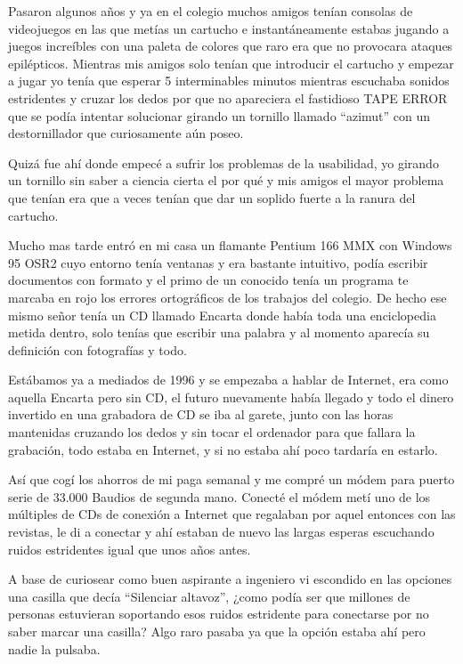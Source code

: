 \bigskip
Pasaron algunos años y ya en el colegio muchos amigos tenían consolas de videojuegos en las que metías un cartucho e instantáneamente estabas jugando a juegos increíbles con una paleta de colores que raro era que no provocara ataques epilépticos. Mientras mis amigos solo tenían que introducir el cartucho y empezar a jugar yo tenía que esperar 5 interminables minutos mientras escuchaba sonidos estridentes y cruzar los dedos por que no apareciera el fastidioso TAPE ERROR que se podía intentar solucionar girando un tornillo llamado ``azimut'' con un destornillador que curiosamente aún poseo.

\bigskip
Quizá fue ahí donde empecé a sufrir los problemas de la usabilidad, yo girando un tornillo sin saber a ciencia cierta el por qué y mis amigos el mayor problema que tenían era que a veces tenían que dar un soplido fuerte a la ranura del cartucho.

\bigskip
Mucho mas tarde entró en mi casa un flamante Pentium 166 MMX con Windows 95 OSR2 cuyo entorno tenía ventanas y era bastante intuitivo, podía escribir documentos con formato y el primo de un conocido tenía un programa te marcaba en rojo los errores ortográficos de los trabajos del colegio. De hecho ese mismo señor tenía un CD llamado Encarta donde había toda una enciclopedia metida dentro, solo tenías que escribir una palabra y al momento aparecía su definición con fotografías y todo.

\bigskip
Estábamos ya a mediados de 1996 y se empezaba a hablar de Internet, era como aquella Encarta pero sin CD, el futuro nuevamente había llegado y todo el dinero invertido en una grabadora de CD se iba al garete, junto con las horas mantenidas cruzando los dedos y sin tocar el ordenador para que fallara la grabación, todo estaba en Internet, y si no estaba ahí poco tardaría en estarlo.

\bigskip
Así que cogí los ahorros de mi paga semanal y me compré un módem para puerto serie de 33.000 Baudios de segunda mano. Conecté el módem metí uno de los múltiples de CDs de conexión a Internet que regalaban por aquel entonces con las revistas, le di a conectar y ahí estaban de nuevo las largas esperas escuchando ruidos estridentes igual que unos años antes.

\bigskip
A base de curiosear como buen aspirante a ingeniero vi escondido en las opciones una casilla que decía ``Silenciar altavoz'', ¿como podía ser que millones de personas estuvieran soportando esos ruidos estridente para conectarse por no saber marcar una casilla? Algo raro pasaba ya que la opción estaba ahí pero nadie la pulsaba.

